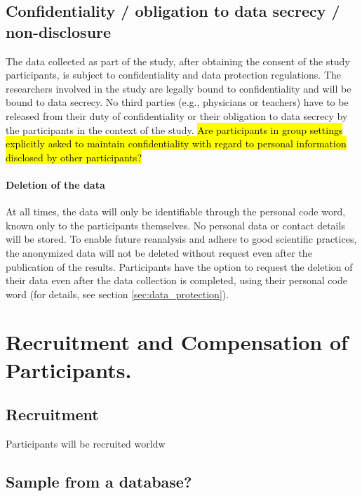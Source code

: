 \documentclass[11pt,twoside,a4paper]{article}
\begin{document}
\subsection{Confidentiality / obligation to data secrecy / non-disclosure}

The data collected as part of the study, after obtaining the consent of the study participants, is subject to confidentiality and data protection regulations.
The researchers involved in the study are legally bound to confidentiality and will be bound to data secrecy.
No third parties (e.g., physicians or teachers) have to be released from their duty of confidentiality or their obligation to data secrecy by the participants in the context of the study.
\hl{Are participants in group settings explicitly asked to maintain confidentiality with regard to personal information disclosed by other participants?}

\paragraph{Deletion of the data} 


At all times, the data will only be identifiable through the personal code word, known only to the participants themselves.
No personal data or contact details will be stored.
To enable future reanalysis and adhere to good scientific practices, the anonymized data will not be deleted without request even after the publication of the results.
Participants have the option to request the deletion of their data even after the data collection is completed, using their personal code word (for details, see section \ref{sec:data_protection}).

\section{Recruitment and Compensation of Participants.}

\subsection{Recruitment}

Participants will be recruited worldw

\subsection{Sample from a database?}
\end{document}
